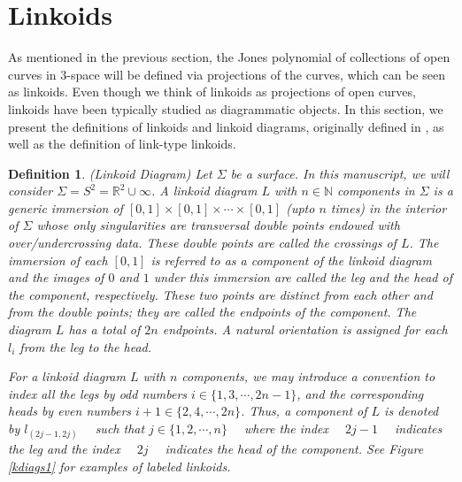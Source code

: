 \documentclass{article}
\newtheorem{definition}{Definition}[section]
\begin{document}
\section{Linkoids}
\label{Linkoids}

As mentioned in the previous section, the Jones polynomial of collections of open curves in 3-space will be defined via projections of the curves, which can be seen as linkoids. Even though we think of linkoids as projections of open curves, linkoids have been typically studied as diagrammatic objects. In this section, we present the definitions of linkoids and linkoid diagrams, originally defined in \cite{Gugumcu2017,Gugumcu2017b,Gugumcu2019, Manouras2021}, as well as the definition of link-type linkoids. 



\begin{definition}\label{linkoid}(Linkoid Diagram)
Let $\Sigma$ be a surface. In this manuscript, we will consider  $\Sigma=S^2 = \mathbb{R}^2 \cup \infty$. A linkoid diagram $L$ with $n \in \mathbb{N}$ components in $\Sigma$ is a generic immersion of $[0,1] \times [0,1] \times \cdots \times [0,1]$ (upto $n$ times) in the interior of $\Sigma$ whose only singularities are transversal double points endowed with over/undercrossing data. These double points are called the crossings of $L$. The immersion of each $[0,1]$ is referred to as a component of the linkoid diagram and the images of $0$ and $1$ under this immersion are called the leg and the head of the component, respectively. These two points are distinct from each other and from the double points; they are called the endpoints of the component. The diagram $L$ has a total of $2n$ endpoints. A natural orientation is assigned for each $l_i$ from the leg to the head. 

For a linkoid diagram $L$ with $n$ components, we may introduce a convention to index all the legs by odd numbers $i \in \{1, 3, \cdots, 2n-1 \}$, and  the corresponding heads by even numbers $i+1 \in \{2, 4, \cdots, 2n \}$. Thus, a component of $L$ is denoted by $l_{\left(2j-1, 2j\right)} \quad $ such that $j \in \{1, 2 , \cdots, n \} \quad$ where the index $\quad 2j-1 \quad$ indicates the leg and the index $\quad 2j \quad$ indicates the head of the component. See Figure \ref{kdiags1} for examples of labeled linkoids.
\end{definition}
\end{document}
